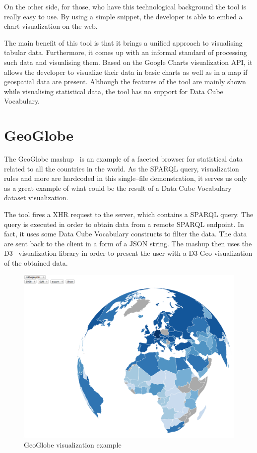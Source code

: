 On the other side, for those, who have this technological background the 
tool is really easy to use. By using a simple snippet, the developer is able to 
embed a chart visualization on the web.

The main benefit of this tool is that it brings a unified approach to 
visualising tabular data. Furthermore, it comes up with an informal standard of 
processing such data and visualising them. Based on the Google Charts visualization 
API, it allows the developer to visualize their data in basic charts 
as well as in a map if geospatial data are present. Although the features of the 
tool are mainly shown while visualising statistical data, the tool has no support for 
Data Cube Vocabulary.

\section{GeoGlobe}
The GeoGlobe mashup~\cite{geoglobe} is an example of a faceted browser for 
statistical data related to all the countries in the world. As the SPARQL 
query, visualization rules and more are hardcoded in this single--file 
demonstration, it serves us only as a great example of what could be the result of a
Data Cube Vocabulary dataset visualization.

The tool fires a XHR request to the server, which contains a SPARQL query. The 
query is executed in order to obtain data from a remote SPARQL endpoint. In 
fact, it uses some Data Cube Vocabulary constructs to filter the data. The data 
are sent back to the client in a form of a JSON string. The mashup then uses the 
D3~\cite{d3} visualization library in order to present the user with a D3 Geo 
visualization of the obtained data.

\begin{figure}
	\centering
	\includegraphics[width=140mm]{img/geoglobe.png}
	\caption{GeoGlobe visualization example}
	\label{fig:geoglobe}
\end{figure}


